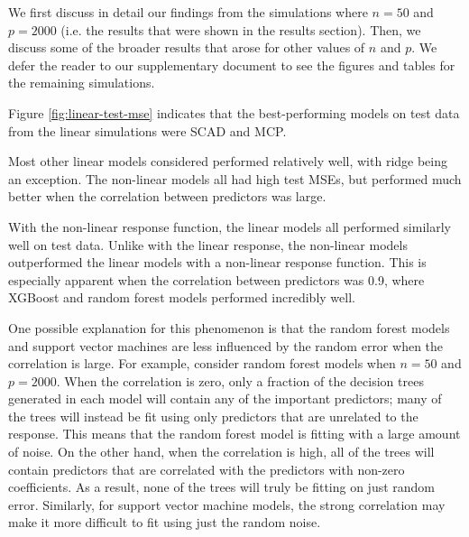 \documentclass{article}
\begin{document}
	We first discuss in detail our findings from the simulations where $n = 50$ and $p = 2000$ (i.e. the results that were shown in the results section). Then, we discuss some of the broader results that arose for other values of $n$ and $p$. We defer the reader to our supplementary document to see the figures and tables for the remaining simulations.
	
	Figure \ref{fig:linear-test-mse} indicates that the best-performing models on test data from the linear simulations were SCAD and MCP. 

	Most other linear models considered performed relatively well, with ridge being an exception. The non-linear models all had high test MSEs, but performed much better when the correlation between predictors was large.
	
	With the non-linear response function, the linear models all performed similarly well on test data. Unlike with the linear response, the non-linear models outperformed the linear models with a non-linear response function. This is especially apparent when the correlation between predictors was 0.9, where XGBoost and random forest models performed incredibly well.
	
	One possible explanation for this phenomenon is that the random forest models and support vector machines are less influenced by the random error when the correlation is large. For example, consider random forest models when $n = 50$ and $p = 2000$. When the correlation is zero, only a fraction of the decision trees generated in each model will contain any of the important predictors; many of the trees will instead be fit using only predictors that are unrelated to the response. This means that the random forest model is fitting with a large amount of noise. On the other hand, when the correlation is high, all of the trees will contain predictors that are correlated with the  predictors with non-zero coefficients. As a result, none of the trees will truly be fitting on just random error. Similarly, for support vector machine models, the strong correlation may make it more difficult to fit using just the random noise.
	
\end{document}
